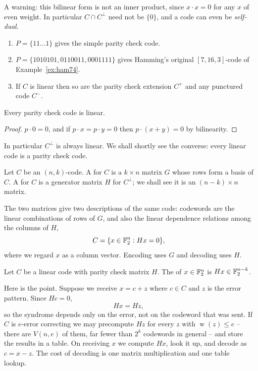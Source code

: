 \documentclass[a4paper]{scrartcl}
\DeclareMathOperator{\wt}{w}
\begin{document}
A warning: this bilinear form is not an inner product, since $x\cdot x = 0$ for any $x$ of even weight. In particular $C \cap C^\perp$ need not be $\{0\}$, and a code can even be \emph{self-dual}.

\begin{example}
	\begin{enumerate}[label=(\roman*)]
		\item $P = \{11\dots1\}$ gives the simple parity check code.
		\item $P = \{1010101, 0110011, 0001111\}$ gives Hamming's original $[7,16,3]$-code of Example~\ref{ex:ham74}.
		\item If $C$ is linear then so are the parity check extension $C^+$ and any punctured code $C^-$.
	\end{enumerate}
\end{example}

\begin{lemma}
	Every parity check code is linear.
\end{lemma}

\begin{proof}
	$p\cdot 0 = 0$, and if $p\cdot x = p\cdot y = 0$ then $p\cdot(x+y) = 0$ by bilinearity.
\end{proof}

In particular $C^\perp$ is always linear. We shall shortly see the converse: every linear code is a parity check code.

\begin{definition}
	Let $C$ be an $(n,k)$-code. A  for $C$ is a $k\times n$ matrix $G$ whose rows form a basis of $C$. A  for $C$ is a generator matrix $H$ for $C^\perp$; we shall see it is an $(n-k)\times n$ matrix.
\end{definition}

The two matrices give two descriptions of the same code: codewords are the linear combinations of rows of $G$, and also the linear dependence relations among the columns of $H$,
$$C = \{x \in \mathbb{F}_2^n : Hx = 0\},$$
where we regard $x$ as a column vector. Encoding uses $G$ and decoding uses $H$.

\begin{definition}[Syndrome]
	Let $C$ be a linear code with parity check matrix $H$. The  of $x \in \mathbb{F}_2^n$ is $Hx \in \mathbb{F}_2^{n-k}$.
\end{definition}

Here is the point. Suppose we receive $x = c + z$ where $c \in C$ and $z$ is the error pattern. Since $Hc = 0$,
$$Hx = Hz,$$
so the syndrome depends only on the error, not on the codeword that was sent. If $C$ is $e$-error correcting we may precompute $Hz$ for every $z$ with $\wt(z)\le e$ -- there are $V(n,e)$ of them, far fewer than $2^k$ codewords in general -- and store the results in a table. On receiving $x$ we compute $Hx$, look it up, and decode as $c = x - z$. The cost of decoding is one matrix multiplication and one table lookup.
\end{document}
